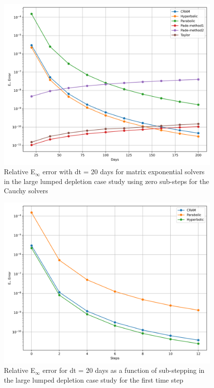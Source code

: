 \begin{figure}[p]
    \centering
    \includegraphics[width=5in]{images/chapter-5/caseStudies/largeLumpedDepletion/msrLargeLumpDepletionEinfErrorerrorSteps0.png}
    \caption{Relative E$_{\infty}$ error with dt = 20 days for matrix exponential solvers in the large lumped depletion case study using zero sub-steps for the Cauchy solvers}
    \label{fig:large_lumped_depletion_Einf_steps0}
\end{figure}

\clearpage

\begin{figure}[p]
    \centering
    \includegraphics[width=5in]{images/chapter-5/caseStudies/largeLumpedDepletion/msrLargeLumpedDepletionEinfErrorerrorWithSteps.png}
    \caption{Relative E$_{\infty}$ error for dt = 20 days as a function of sub-stepping in the large lumped depletion case study for the first time step}
    \label{fig:large_lumped_depletion_Einf_with_substeps}
\end{figure}

